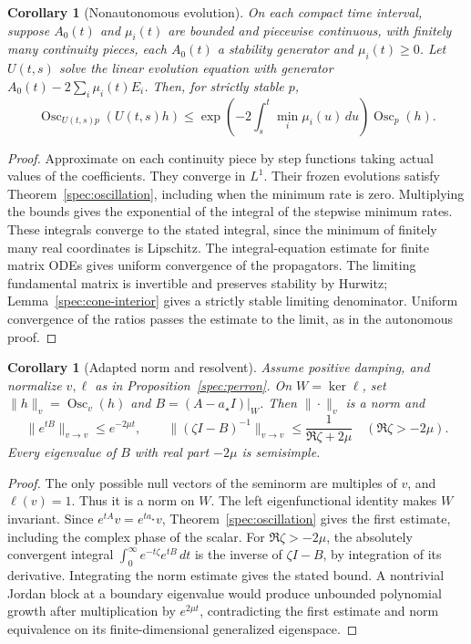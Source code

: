 \documentclass[reqno]{amsart}
\newtheorem{corollary}[theorem]{Corollary}
\theoremstyle{definition}
\theoremstyle{remark}
\begin{document}
\begin{corollary}[Nonautonomous evolution]\label{spec:nonautonomous}
On each compact time interval, suppose \(A_0(t)\) and \(\mu_i(t)\)
are bounded and piecewise continuous, with finitely many continuity
pieces, each \(A_0(t)\) a stability generator and \(\mu_i(t)\ge0\).
Let \(U(t,s)\) solve the linear evolution equation with generator
\(A_0(t)-2\sum_i\mu_i(t)E_i\).  Then, for strictly stable \(p\),
\[
 \operatorname{Osc}_{U(t,s)p}(U(t,s)h)
 \le \exp\!\left(-2\int_s^t\min_i\mu_i(u)\,du\right)
       \operatorname{Osc}_p(h).
\]
\end{corollary}
\begin{proof}
Approximate on each continuity piece by step functions taking actual
values of the coefficients.  They converge in \(L^1\).  Their frozen
evolutions satisfy Theorem~\ref{spec:oscillation}, including when the
minimum rate is zero.  Multiplying the bounds gives the exponential
of the integral of the stepwise minimum rates.  These integrals converge
to the stated integral, since the minimum of finitely many real
coordinates is Lipschitz.  The integral-equation estimate for finite
matrix ODEs gives uniform convergence of the propagators.  The limiting
fundamental matrix is invertible and preserves stability by Hurwitz;
Lemma~\ref{spec:cone-interior} gives a strictly stable limiting
denominator.  Uniform convergence of the ratios passes the estimate
to the limit, as in the autonomous proof.
\end{proof}

\begin{corollary}[Adapted norm and resolvent]\label{spec:resolvent}
Assume positive damping, and normalize \(v,\ell\) as in
Proposition~\ref{spec:perron}.  On \(W=\ker\ell\), set
\(\|h\|_v=\operatorname{Osc}_v(h)\) and
\(B=(A-a_\star I)|_W\).  Then \(\|\cdot\|_v\) is a norm and
\[
 \|e^{tB}\|_{v\to v}\le e^{-2\mu t},\qquad
 \|(\zeta I-B)^{-1}\|_{v\to v}
 \le\frac1{\Re\zeta+2\mu}\quad(\Re\zeta>-2\mu).
\]
Every eigenvalue of \(B\) with real part \(-2\mu\) is semisimple.
\end{corollary}
\begin{proof}
The only possible null vectors of the seminorm are multiples of \(v\),
and \(\ell(v)=1\).  Thus it is a norm on \(W\).  The left
eigenfunctional identity makes \(W\) invariant.  Since
\(e^{tA}v=e^{ta_\star}v\), Theorem~\ref{spec:oscillation} gives
the first estimate, including the complex phase of the scalar.
For \(\Re\zeta>-2\mu\), the absolutely convergent integral
\(\int_0^\infty e^{-t\zeta}e^{tB}\,dt\) is the inverse of
\(\zeta I-B\), by integration of its derivative.  Integrating the
norm estimate gives the stated bound.  A nontrivial Jordan block at a
boundary eigenvalue would produce unbounded polynomial growth after
multiplication by \(e^{2\mu t}\), contradicting the first estimate
and norm equivalence on its finite-dimensional generalized eigenspace.
\end{proof}
\end{document}
